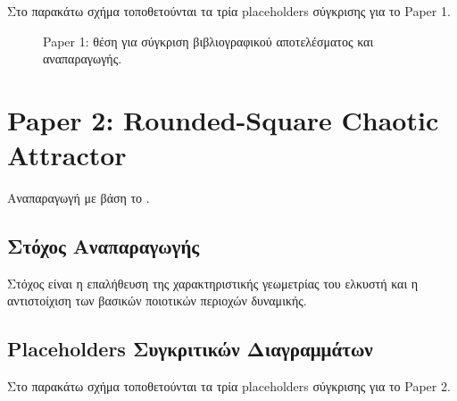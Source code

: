 \documentclass[11pt,a4paper]{report}
\begin{document}
Στο παρακάτω σχήμα τοποθετούνται τα τρία placeholders σύγκρισης για το Paper 1.

\begin{figure}[H]
\centering
\begin{subfigure}[t]{0.31\textwidth}
\centering
{}
\end{subfigure}
\hfill
\begin{subfigure}[t]{0.31\textwidth}
\centering
{}
\end{subfigure}
\hfill
\begin{subfigure}[t]{0.31\textwidth}
\centering
{}
\end{subfigure}
\caption{Paper 1: θέση για σύγκριση βιβλιογραφικού αποτελέσματος και αναπαραγωγής.}
\label{fig:ch3-paper1-placeholder}
\end{figure}

\section{Paper 2: Rounded-Square Chaotic Attractor}

Αναπαραγωγή με βάση το \cite{pham2017_rounded_square}.

\subsection{Στόχος Αναπαραγωγής}

Στόχος είναι η επαλήθευση της χαρακτηριστικής γεωμετρίας του ελκυστή και η αντιστοίχιση των βασικών ποιοτικών περιοχών δυναμικής.

\subsection{Placeholders Συγκριτικών Διαγραμμάτων}

Στο παρακάτω σχήμα τοποθετούνται τα τρία placeholders σύγκρισης για το Paper 2.
\end{document}
